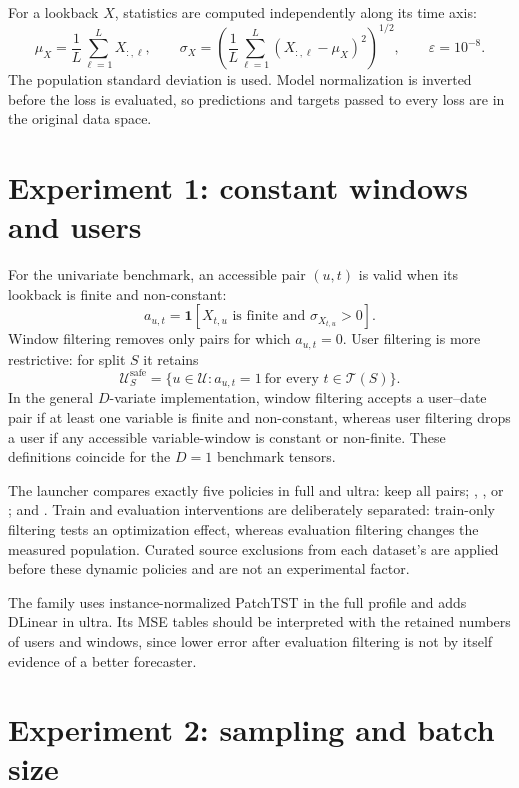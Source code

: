 \documentclass[10pt]{article}
\begin{document}
For a lookback $X$, statistics are computed independently along its time axis:
\[
  \mu_X=\frac1L\sum_{\ell=1}^{L}X_{:,\ell},\qquad
  \sigma_X=\left(\frac1L\sum_{\ell=1}^{L}
  (X_{:,\ell}-\mu_X)^2\right)^{1/2},\qquad \varepsilon=10^{-8}.
\]
The population standard deviation is used. Model normalization is inverted
before the loss is evaluated, so predictions and targets passed to every loss
are in the original data space.

\section{Experiment 1: constant windows and users}
\label{sec:constants}

For the univariate benchmark, an accessible pair $(u,t)$ is valid when its
lookback is finite and non-constant:
\[
  a_{u,t}=\bm 1\!\left[
  X_{t,u}\text{ is finite and }\sigma_{X_{t,u}}>0
  \right].
\]
Window filtering removes only pairs for which $a_{u,t}=0$. User filtering is
more restrictive: for split $S$ it retains
\[
  \mathcal U_{S}^{\mathrm{safe}}
  =\{u\in\mathcal U:a_{u,t}=1\ \text{for every }t\in\mathcal T(S)\}.
\]
In the general $D$-variate implementation, window filtering accepts a
user--date pair if at least one variable is finite and non-constant, whereas
user filtering drops a user if any accessible variable-window is constant or
non-finite. These definitions coincide for the $D=1$ benchmark tensors.

The launcher compares exactly five policies in full and ultra: keep all pairs;
, , or
; and . Train and evaluation
interventions are deliberately separated: train-only filtering tests an
optimization effect, whereas evaluation filtering changes the measured
population. Curated source exclusions from each dataset's 
are applied before these dynamic policies and are not an experimental factor.

The family uses instance-normalized PatchTST in the full profile and adds
DLinear in ultra. Its MSE tables should be interpreted with the retained
numbers of users and windows, since lower error after evaluation filtering is
not by itself evidence of a better forecaster.

\section{Experiment 2: sampling and batch size}
\label{sec:sampling}
\end{document}
